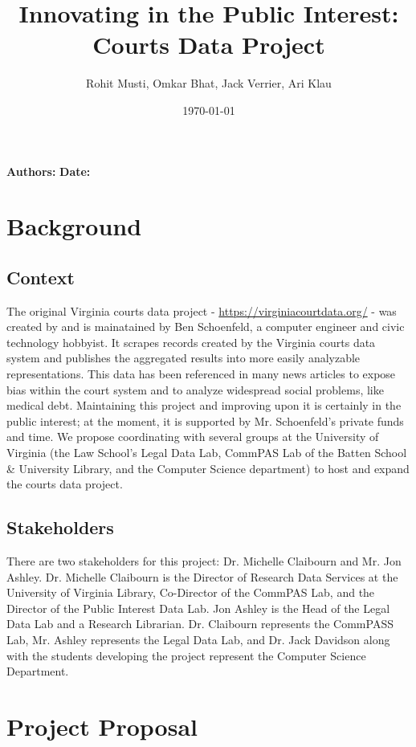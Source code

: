 \documentclass[12pt]{article}
\title{Innovating in the Public Interest:\\Courts Data Project}
\author{Rohit Musti, Omkar Bhat, Jack Verrier, Ari Klau}
\date{\today}
\renewcommand{\maketitle}{
    
    {\noindent\huge\bfseries\thetitle}

    \vspace{0.25em}
    {\noindent \textbf{Authors:} \theauthor} 
    {\noindent \textbf{Date:} \thedate}

}
\begin{document}
 

\maketitle

\section{Background}

\subsection{Context}

\noindent The original Virginia courts data project - \url{https://virginiacourtdata.org/}  -  was created by and is mainatained by Ben Schoenfeld, a computer engineer and civic technology hobbyist.
It scrapes records created by the Virginia courts data system and publishes the aggregated results into more easily analyzable representations.
This data has been referenced in many news articles to expose bias within the court system and to analyze widespread social problems, like medical debt.
Maintaining this project and improving upon it is certainly in the public interest; at the moment, it is supported by Mr. Schoenfeld's private funds and time.
We propose coordinating with several groups at the University of Virginia (the Law School's Legal Data Lab, CommPAS Lab of the Batten School \& University Library, and the Computer Science department) to host and expand the courts data project.

\subsection{Stakeholders}

\noindent There are two stakeholders for this project: Dr. Michelle Claibourn and Mr. Jon Ashley. 
Dr. Michelle Claibourn is the Director of Research Data Services at the University of Virginia Library, Co-Director of the CommPAS Lab, and the Director of the Public Interest Data Lab.
Jon Ashley is the Head of the Legal Data Lab and a Research Librarian.
Dr. Claibourn represents the CommPASS Lab, Mr. Ashley represents the Legal Data Lab, and Dr. Jack Davidson along with the students developing the project represent the Computer Science Department.

\section{Project Proposal}
\end{document}
